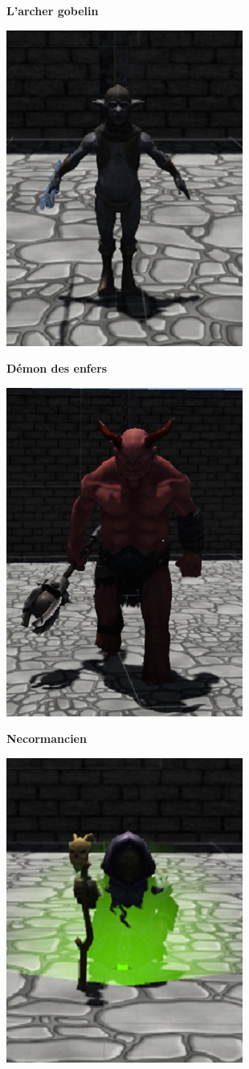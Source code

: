\documentclass[a4paper, 12pt]{article}
\begin{document}
\bigbreak
\large \textbf{L'archer gobelin}\\
\smallbreak
\centerline{\includegraphics[scale=0.8]{Ranger.png}}
\bigbreak
\large \textbf{D\'emon des enfers}\\
\smallbreak
\centerline{\includegraphics[scale=0.8]{HellKeeper.png}}
\bigbreak
\large \textbf{Necormancien}\\
\smallbreak
\centerline{\includegraphics[scale=0.8]{Necromancer.png}}
\end{document}
